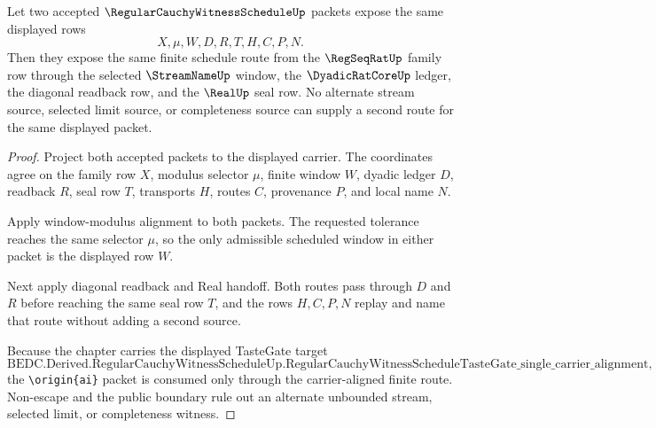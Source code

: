 \begin{theorem}
\label{thm:regular-cauchy-witness-schedule-shared-window-lock}
Let two accepted $\RegularCauchyWitnessScheduleUp$ packets expose the same displayed rows
$$
X,\mu,W,D,R,T,H,C,P,N.
$$
Then they expose the same finite schedule route from the $\RegSeqRatUp$ family row through the selected $\StreamNameUp$ window, the $\DyadicRatCoreUp$ ledger, the diagonal readback row, and the $\RealUp$ seal row. No alternate stream source, selected limit source, or completeness source can supply a second route for the same displayed packet.
\end{theorem}
\begin{proof}
Project both accepted packets to the displayed carrier. The coordinates agree on the family row $X$, modulus selector $\mu$, finite window $W$, dyadic ledger $D$, readback $R$, seal row $T$, transports $H$, routes $C$, provenance $P$, and local name $N$.

Apply window-modulus alignment to both packets. The requested tolerance reaches the same selector $\mu$, so the only admissible scheduled window in either packet is the displayed row $W$.

Next apply diagonal readback and Real handoff. Both routes pass through $D$ and $R$ before reaching the same seal row $T$, and the rows $H,C,P,N$ replay and name that route without adding a second source.

Because the chapter carries the displayed TasteGate target
$$
\text{BEDC.Derived.RegularCauchyWitnessScheduleUp.RegularCauchyWitnessScheduleTasteGate\_single\_carrier\_alignment},
$$
the \texttt{\textbackslash origin\{ai\}} packet is consumed only through the carrier-aligned finite route. Non-escape and the public boundary rule out an alternate unbounded stream, selected limit, or completeness witness.
\end{proof}

